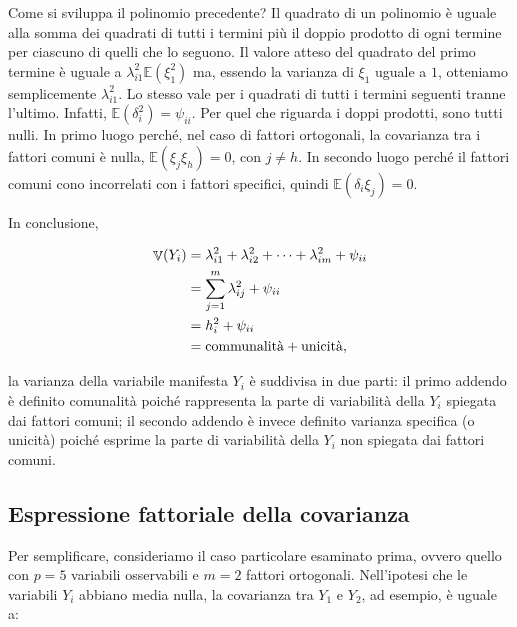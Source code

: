 \documentclass[
  11pt,
]{krantz}
\DeclareMathOperator{\V}{\mathbb{V}} %
\newcommand{\E}{\mathbb{E}} %
\theoremstyle{definition}
\theoremstyle{definition}
\theoremstyle{definition}
\theoremstyle{definition}
\theoremstyle{remark}
\begin{document}
Come si sviluppa il polinomio precedente? Il quadrato di un polinomio è uguale alla somma dei quadrati di tutti i termini più il doppio prodotto di ogni termine per ciascuno di quelli che lo seguono. Il valore atteso del quadrato del primo termine è uguale a \(\lambda_{i1}^2\E(\xi_1^2)\) ma, essendo la varianza di \(\xi_1\) uguale a \(1\), otteniamo semplicemente \(\lambda_{i1}^2\). Lo stesso vale per i quadrati di tutti i termini seguenti tranne l'ultimo. Infatti, \(\E(\delta_i^2)=\psi_{ii}\). Per quel che riguarda i doppi prodotti, sono tutti nulli. In primo luogo perché, nel caso di fattori ortogonali, la covarianza tra i fattori comuni è nulla, \(\E(\xi_j \xi_h)=0\), con \(j \neq h\). In secondo luogo perché il fattori comuni cono incorrelati con i fattori specifici, quindi \(\E(\delta_i \xi_j)=0\).

In conclusione,

\begin{equation}
\begin{aligned}
  \V(Y_i) &= \lambda_{i1}^2 + \lambda_{i2}^2 + \dots + \lambda_{im}^2 + \psi_{ii} \notag\\
  &= \sum_{j=1}^m \lambda_{ij}^2 + \psi_{ii}\notag\\
  &= h_i^2 + \psi_{ii}\notag\\
  &=\text{communalità} + \text{unicità},\notag
\end{aligned}
\end{equation}

la varianza della variabile manifesta \(Y_i\) è suddivisa in due parti: il primo addendo è definito comunalità poiché rappresenta la parte di variabilità della \(Y_i\) spiegata dai fattori comuni; il secondo addendo è invece definito varianza specifica (o unicità) poiché esprime la parte di variabilità della \(Y_i\) non spiegata dai fattori comuni.

\hypertarget{espressione-fattoriale-della-covarianza}{%
\subsection{Espressione fattoriale della covarianza}\label{espressione-fattoriale-della-covarianza}}

Per semplificare, consideriamo il caso particolare esaminato prima, ovvero quello con \(p=5\) variabili osservabili e \(m=2\) fattori ortogonali. Nell'ipotesi che le variabili \(Y_i\) abbiano media nulla, la covarianza tra \(Y_1\) e \(Y_2\), ad esempio, è uguale a:
\end{document}
